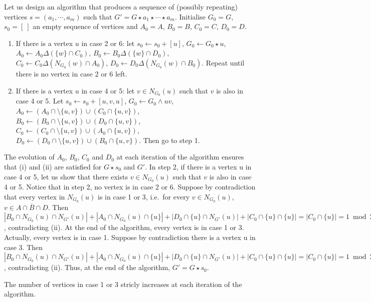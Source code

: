 \documentclass[a4paper,UKenglish,cleveref,autoref,thm-restate]{arxiv}
\newcommand{\sm}{\setminus}
\begin{document}
Let us design an algorithm that produces a sequence of (possibly repeating) vertices $s = (a_1, \cdots, a_m)$ such that $G' = G \star a_1 \star \cdots \star a_m$. Initialise $G_0 = G$, $s_0 = [~]$ an empty sequence of vertices and $A_0 = A$, $B_0 = B$, $C_0 = C$, $D_0 = D$.

\begin{enumerate}
    \item If there is a vertex $u$ in case 2 or 6: let $s_0 \leftarrow s_0 + [u]$, $G_0 \leftarrow G_0 \star u$, $A_0 \leftarrow A_0 \Delta ( \{w\}\cap C_0)$, $B_0 \leftarrow B_0 \Delta ( \{w\}\cap D_0)$, $C_0 \leftarrow C_0 \Delta ( N_{G_0}(w)\cap A_0)$, $D_0 \leftarrow D_0 \Delta ( N_{G_0}(w)\cap B_0)$. Repeat until there is no vertex in case 2 or 6 left. 
    \item If there is a vertex $u$ in case 4 or 5: let $v \in N_{G_0}(u)$ such that $v$ is also in case 4 or 5. 
    Let $s_0 \leftarrow s_0 + [u, v, u]$, $G_0 \leftarrow G_0 \wedge u v$, $A_0 \leftarrow (A_0 \cap \sm \{u,v\}) \cup (C_0 \cap \{u,v\})$, $B_0 \leftarrow (B_0 \cap \sm \{u,v\}) \cup (D_0 \cap \{u,v\})$, $C_0 \leftarrow (C_0 \cap \sm \{u,v\}) \cup (A_0 \cap \{u,v\})$, $D_0 \leftarrow (D_0 \cap \sm \{u,v\}) \cup (B_0 \cap \{u,v\})$. Then go to step 1.
\end{enumerate}

 The evolution of $A_0$, $B_0$, $C_0$ and $D_0$ at each iteration of the algorithm ensures that (i) and (ii) are satisfied for $G \star s_0$ and $G'$. In step 2, if there is a vertex u in case 4 or 5, let us show that there exists $v \in N_{G_0}(u)$ such that $v$ is also in case 4 or 5. Notice that in step 2, no vertex is in case 2 or 6. Suppose by contradiction that every vertex in $N_{G_0}(u)$ is in case 1 or 3, i.e.~for every $v \in N_{G_0}(u)$, $v \in A \cap \overline B  \cap D$. Then $|B_0\cap N_{G_0}(u)\cap N_{G'}(u)| + |A_0\cap N_{G_0}(u)\cap \{u\}| +  |D_0\cap \{u\}\cap N_{G'}(u)| + |C_0\cap \{u\}\cap \{u\}| = |C_0 \cap \{u\}| = 1 \bmod 2$, contradicting (ii). At the end of the algorithm, every vertex is in case 1 or 3. Actually, every vertex is in case 1. Suppose by contradiction there is a vertex u in case 3. Then $|B_0\cap N_{G_0}(u)\cap N_{G'}(u)| + |A_0\cap N_{G_0}(u)\cap \{u\}| +  |D_0\cap \{u\}\cap N_{G'}(u)| + |C_0\cap \{u\}\cap \{u\}|  = |C_0 \cap \{u\}| = 1 \bmod 2$, contradicting (ii). Thus, at the end of the algorithm, $G' = G \star s_0$.

 The number of vertices in case 1 or 3 stricly increases at each iteration of the algorithm.
\end{document}
